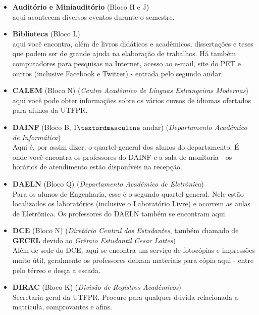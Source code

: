 \documentclass[a4paper,12pt,openany]{article}
\begin{document}
\begin{itemize}

\item \textbf{Auditório e Miniauditório} (Bloco H e J)\\ aqui acontecem diversos eventos durante o semestre.

\item \textbf{Biblioteca} (Bloco L) \\aqui você encontra, além de livros didáticos e acadêmicos, dissertações e teses que podem ser de grande ajuda na elaboração de trabalhos. Há também computadores para pesquisas na Internet, acesso ao e-mail, site do PET e outros (inclusive Facebook e Twitter) - entrada pelo segundo andar.

\item \textbf{CALEM} (Bloco N) (\textit{Centro Acadêmico de Línguas Estrangeiras Modernas}) \\aqui você pode obter informações sobre os vários cursos de idiomas ofertados para alunos da UTFPR.

\item \textbf{DAINF} (Bloco B, 1$\textordmasculine$ andar) (\textit{Departamento Acadêmico de Informática}) \\Aqui é, por assim dizer, o quartel-general dos alunos do departamento. É onde você encontra os professores do DAINF e a sala de monitoria - os horários de atendimento estão disponíveis na recepção.

\item \textbf{DAELN} (Bloco Q) (\textit{Departamento Acadêmico de Eletrônica})\\ Para os alunos de Engenharia, esse é o segundo quartel-general. Nele estão localizados os laboratórios (inclusive o Laboratório Livre) e ocorrem as aulas de Eletrônica. Os professores do DAELN também se encontram aqui.

\item \textbf{DCE} (Bloco N) (\textit{Diretório Central dos Estudantes}, também chamado de \textbf{GECEL} devido ao \textit{Grêmio Estudantil Cesar Lattes})\\ Além de sede do DCE, aqui se encontra um serviço de fotocópias e impressões muito útil, geralmente os professores deixam materiais para cópia aqui - entre pelo térreo e desça a escada.

\item \textbf{DIRAC} (Bloco K) (\textit{Divisão de Registros Acadêmicos})\\ Secretaria geral da UTFPR. Procure para qualquer dúvida relacionada a matrícula, comprovantes e afins.


\end{itemize}
\end{document}
